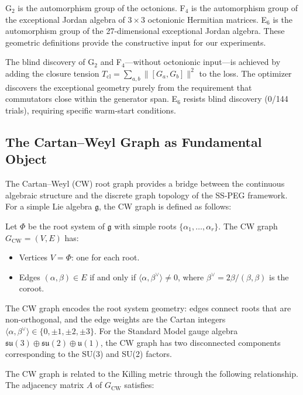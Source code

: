 G$_2$ is the automorphism group of the octonions. F$_4$ is the automorphism group of the exceptional Jordan algebra of $3 \times 3$ octonionic Hermitian matrices. E$_6$ is the automorphism group of the 27-dimensional exceptional Jordan algebra. These geometric definitions provide the constructive input for our experiments.

The blind discovery of G$_2$ and F$_4$---without octonionic input---is achieved by adding the closure tension $T_{\mathrm{cl}} = \sum_{a,b} \|[G_a, G_b]\|^2$ to the loss. The optimizer discovers the exceptional geometry purely from the requirement that commutators close within the generator span. E$_6$ resists blind discovery (0/144 trials), requiring specific warm-start conditions.

\subsection{The Cartan--Weyl Graph as Fundamental Object}\label{sec:cartan_weyl_graph}

The Cartan--Weyl (CW) root graph provides a bridge between the continuous algebraic structure and the discrete graph topology of the SS-PEG framework. For a simple Lie algebra $\mathfrak{g}$, the CW graph is defined as follows:

\begin{definition}
Let $\Phi$ be the root system of $\mathfrak{g}$ with simple roots $\{\alpha_1, \ldots, \alpha_r\}$. The CW graph $G_{\mathrm{CW}} = (V, E)$ has:
\begin{itemize}
\item Vertices $V = \Phi$: one for each root.
\item Edges $(\alpha, \beta) \in E$ if and only if $\langle \alpha, \beta^\vee \rangle \neq 0$, where $\beta^\vee = 2\beta / (\beta, \beta)$ is the coroot.
\end{itemize}
\end{definition}

The CW graph encodes the root system geometry: edges connect roots that are non-orthogonal, and the edge weights are the Cartan integers $\langle \alpha, \beta^\vee \rangle \in \{0, \pm 1, \pm 2, \pm 3\}$. For the Standard Model gauge algebra $\mathfrak{su}(3) \oplus \mathfrak{su}(2) \oplus \mathfrak{u}(1)$, the CW graph has two disconnected components corresponding to the SU(3) and SU(2) factors.

The CW graph is related to the Killing metric through the following relationship. The adjacency matrix $A$ of $G_{\mathrm{CW}}$ satisfies:

